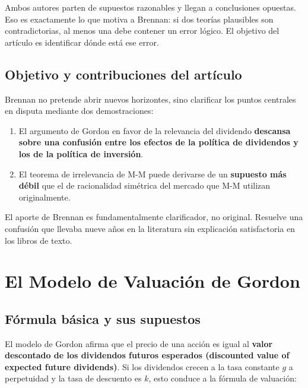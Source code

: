 \documentclass[12pt]{article}
\begin{document}
\begin{intuicion}
Ambos autores parten de supuestos razonables y llegan a conclusiones opuestas. Eso es exactamente lo que motiva a Brennan: si dos teor\'ias plausibles son contradictorias, al menos una debe contener un error l\'ogico. El objetivo del art\'iculo es identificar d\'onde est\'a ese error.
\end{intuicion}

\subsection{Objetivo y contribuciones del art\'iculo}

Brennan no pretende abrir nuevos horizontes, sino clarificar los puntos centrales en disputa mediante dos demostraciones:
\begin{enumerate}
  \item El argumento de Gordon en favor de la relevancia del dividendo \textbf{descansa sobre una confusi\'on entre los efectos de la pol\'itica de dividendos y los de la pol\'itica de inversi\'on}.
  \item El teorema de irrelevancia de M-M puede derivarse de un \textbf{supuesto m\'as d\'ebil} que el de racionalidad sim\'etrica del mercado que M-M utilizan originalmente.
\end{enumerate}

\begin{intuicion}
El aporte de Brennan es fundamentalmente clarificador, no original. Resuelve una confusi\'on que llevaba nueve a\~nos en la literatura sin explicaci\'on satisfactoria en los libros de texto.
\end{intuicion}

\section{El Modelo de Valuaci\'on de Gordon}

\subsection{F\'ormula b\'asica y sus supuestos}

El modelo de Gordon afirma que el precio de una acci\'on es igual al \textbf{valor descontado de los dividendos futuros esperados (discounted value of expected future dividends)}. Si los dividendos crecen a la tasa constante $g$ a perpetuidad y la tasa de descuento es $k$, esto conduce a la f\'ormula de valuaci\'on:
\end{document}
